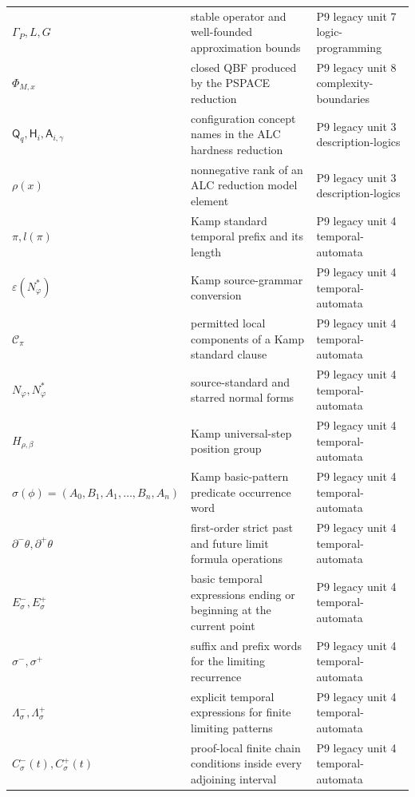 \begin{longtable}{@{}p{}p{}p{}@{}}
\(\Gamma_P,\allowbreak L,\allowbreak G\) & stable operator and well-founded approximation bounds & P9 legacy unit 7 logic-\allowbreak{}programming \\
\(\Phi_{M,x}\) & closed QBF produced by the PSPACE reduction & P9 legacy unit 8 complexity-\allowbreak{}boundaries \\
\(\mathsf Q_q,\allowbreak \mathsf H_i,\allowbreak \mathsf A_{i,\gamma}\) & configuration concept names in the ALC hardness reduction & P9 legacy unit 3 description-\allowbreak{}logics \\
\(\rho(x)\) & nonnegative rank of an ALC reduction model element & P9 legacy unit 3 description-\allowbreak{}logics \\
\(\pi,\allowbreak l(\pi)\) & Kamp standard temporal prefix and its length & P9 legacy unit 4 temporal-\allowbreak{}automata \\
\(\varepsilon(N^*_{\varphi})\) & Kamp source-grammar conversion & P9 legacy unit 4 temporal-\allowbreak{}automata \\
\(\mathcal C_\pi\) & permitted local components of a Kamp standard clause & P9 legacy unit 4 temporal-\allowbreak{}automata \\
\(N_\varphi,\allowbreak N^*_{\varphi}\) & source-standard and starred normal forms & P9 legacy unit 4 temporal-\allowbreak{}automata \\
\(H_{\rho,\beta}\) & Kamp universal-step position group & P9 legacy unit 4 temporal-\allowbreak{}automata \\
\(\sigma(\phi)=(A_0,\allowbreak B_1,\allowbreak A_1,\allowbreak \ldots,\allowbreak B_n,\allowbreak A_n)\) & Kamp basic-pattern predicate occurrence word & P9 legacy unit 4 temporal-\allowbreak{}automata \\
\(\partial^-\theta,\allowbreak \partial^+\theta\) & first-order strict past and future limit formula operations & P9 legacy unit 4 temporal-\allowbreak{}automata \\
\(E^-_\sigma,\allowbreak E^+_\sigma\) & basic temporal expressions ending or beginning at the current point & P9 legacy unit 4 temporal-\allowbreak{}automata \\
\(\sigma^-,\allowbreak \sigma^+\) & suffix and prefix words for the limiting recurrence & P9 legacy unit 4 temporal-\allowbreak{}automata \\
\(\Lambda^-_\sigma,\allowbreak \Lambda^+_\sigma\) & explicit temporal expressions for finite limiting patterns & P9 legacy unit 4 temporal-\allowbreak{}automata \\
\(C^-_\sigma(t),\allowbreak C^+_\sigma(t)\) & proof-local finite chain conditions inside every adjoining interval & P9 legacy unit 4 temporal-\allowbreak{}automata \\

\end{longtable}
